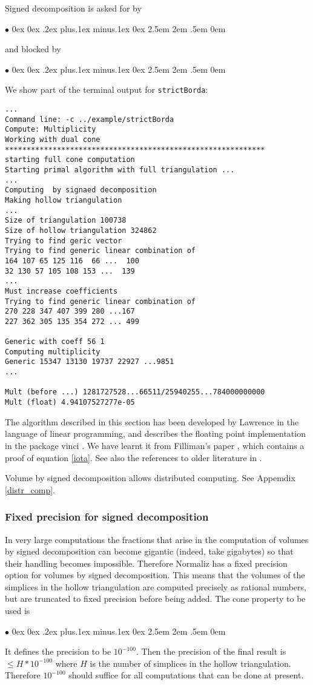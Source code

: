 \documentclass[12pt,a4paper]{scrartcl}
\newcommand{\stdli}{ \topsep0ex \partopsep0ex %
\parsep.2ex plus.1ex minus.1ex \itemsep0ex%
\leftmargin2.5em \labelwidth2em \labelsep.5em \rightmargin0em}%
\renewenvironment{itemize}{\begin{list}{{$\bullet$}}{\stdli}}{\end{list}}
\theoremstyle{definition}
\def\itemtt[#1]{\item[\textbf{\ttt{#1}}]}
\def\ttt{\texttt}
\begin{document}
Signed decomposition is asked for by
\begin{itemize}
	\itemtt[SignedDec]
\end{itemize}
and blocked by
\begin{itemize}
	\itemtt[NoSignedDec]
\end{itemize}

We show part of the terminal output for \ttt{strictBorda}: 
 \begin{Verbatim}
...
Command line: -c ../example/strictBorda 
Compute: Multiplicity 
Working with dual cone
************************************************************
starting full cone computation
Starting primal algorithm with full triangulation ...
...
Computing  by signaed decomposition
Making hollow triangulation
...
Size of triangulation 100738
Size of hollow triangulation 324862
Trying to find geric vector
Trying to find generic linear combination of 
164 107 65 125 116  66 ...  100
32 130 57 105 108 153 ...  139
...
Must increase coefficients
Trying to find generic linear combination of 
270 228 347 407 399 280 ...167
227 362 305 135 354 272 ... 499

Generic with coeff 56 1
Computing multiplicity
Generic 15347 13130 19737 22927 ...9851 
...

Mult (before ...) 1281727528...66511/25940255...784000000000
Mult (float) 4.94107527277e-05
 \end{Verbatim}
 
 The algorithm described in this section has been developed by Lawrence \cite{Lawrence} in the language of linear programming, and \cite{practical} describes the floating point implementation in  the package vinci \cite{vinci}. We have learnt it from Filliman's paper \cite{Filli}, which contains a proof of equation \eqref{iota}. See also the references to older literature in \cite{Filli}.
 
 Volume by signed decomposition allows distributed computing. See Appemdix \ref{distr_comp}.
 
 \subsubsection{Fixed precision for signed decomposition}\label{FixedPrecision}
 
 In very large computations the fractions that arise in the computation of volumes by signed decomposition can become gigantic (indeed, take gigabytes) so that their handling becomes impossible. Therefore Normaliz has a fixed precision option for volumes by signed decomposition. This means that the volumes of the simplices in the hollow triangulation are computed precisely as rational numbers, but are truncated to fixed precision before being added.
The cone property to be used is
  \begin{itemize}
 	\itemtt[FixedPrecision]
 \end{itemize}
It defines the precision to be $10^{-100}$. Then the precision of the final result is $\le H*10^{-100}$ where $H$ is the number of simplices in the hollow triangulation. Therefore $10^{-100}$ should suffice for all computations that can be done at present.
 
\end{document}
